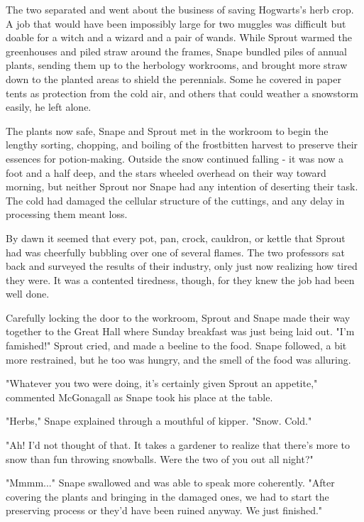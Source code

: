 The two separated and went about the business of saving Hogwarts's herb crop. A job that would have been impossibly large for two muggles was difficult but doable for a witch and a wizard and a pair of wands. While Sprout warmed the greenhouses and piled straw around the frames, Snape bundled piles of annual plants, sending them up to the herbology workrooms, and brought more straw down to the planted areas to shield the perennials. Some he covered in paper tents as protection from the cold air, and others that could weather a snowstorm easily, he left alone.

The plants now safe, Snape and Sprout met in the workroom to begin the lengthy sorting, chopping, and boiling of the frostbitten harvest to preserve their essences for potion-making. Outside the snow continued falling - it was now a foot and a half deep, and the stars wheeled overhead on their way toward morning, but neither Sprout nor Snape had any intention of deserting their task. The cold had damaged the cellular structure of the cuttings, and any delay in processing them meant loss.

By dawn it seemed that every pot, pan, crock, cauldron, or kettle that Sprout had was cheerfully bubbling over one of several flames. The two professors sat back and surveyed the results of their industry, only just now realizing how tired they were. It was a contented tiredness, though, for they knew the job had been well done.

Carefully locking the door to the workroom, Sprout and Snape made their way together to the Great Hall where Sunday breakfast was just being laid out. "I'm famished!" Sprout cried, and made a beeline to the food. Snape followed, a bit more restrained, but he too was hungry, and the smell of the food was alluring.

"Whatever you two were doing, it's certainly given Sprout an appetite," commented McGonagall as Snape took his place at the table.

"Herbs," Snape explained through a mouthful of kipper. "Snow. Cold."

"Ah! I'd not thought of that. It takes a gardener to realize that there's more to snow than fun throwing snowballs. Were the two of you out all night?"

"Mmmm..." Snape swallowed and was able to speak more coherently. "After covering the plants and bringing in the damaged ones, we had to start the preserving process or they'd have been ruined anyway. We just finished."

